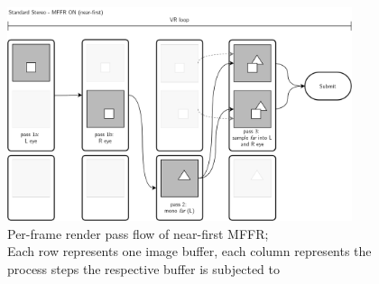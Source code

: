 \begin{figure}[htb]
  \centering
  \includegraphics[width=0.9\textwidth]{pictures/MFFR_nearfirst}
  \caption{Per-frame render pass flow of near-first \gls{MFFR}; \\
  Each row represents one image buffer, each column represents the process steps the respective buffer is subjected to} \label{fig:flowchart_MFFR_NearFirst}
\end{figure}
 
